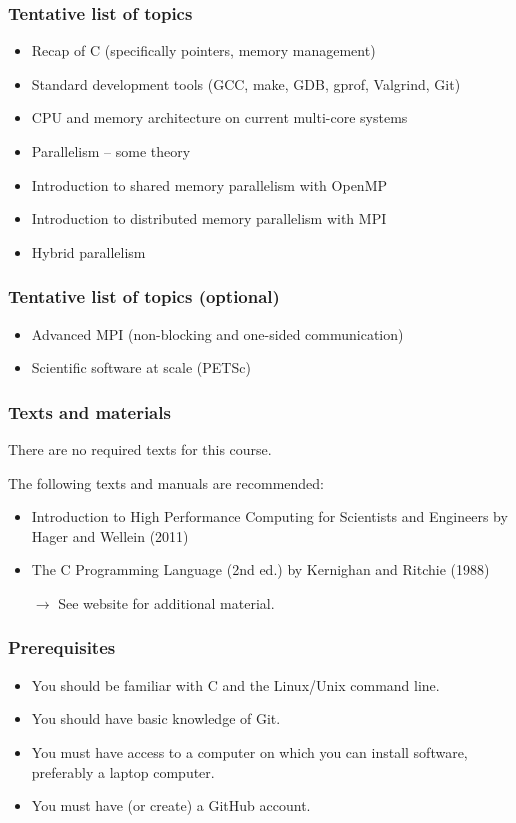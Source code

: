 \documentclass[12pt,t]{beamer}
\begin{document}
  \begin{frame}
    \frametitle{Tentative list of topics}

    \begin{itemize}
      \item Recap of C (specifically pointers, memory management)
      \item Standard development tools (GCC, make, GDB, gprof, Valgrind, Git)
      \item CPU and memory architecture on current multi-core systems
      \item Parallelism -- some theory
      \item Introduction to shared memory parallelism with OpenMP
      \item Introduction to distributed memory parallelism with MPI
      \item Hybrid parallelism
    \end{itemize}
  \end{frame}

  \begin{frame}
    \frametitle{Tentative list of topics (optional)}

    \begin{itemize}
      \item Advanced MPI (non-blocking and one-sided communication)
      \item Scientific software at scale (PETSc)
    \end{itemize}
  \end{frame}

  \begin{frame}
    \frametitle{Texts and materials}

    There are no required texts for this course.

    The following texts and manuals are recommended:
    \begin{itemize}
      \item Introduction to High Performance Computing for Scientists and Engineers by Hager and Wellein (2011)
      \item The C Programming Language (2nd ed.) by Kernighan and Ritchie (1988)
    \end{itemize}
    \begin{itemize}
      \item[$\rightarrow$] See website for additional material.
    \end{itemize}
  \end{frame}

  \begin{frame}
    \frametitle{Prerequisites}

    \begin{itemize}
      \item You should be familiar with C and the Linux/Unix command line.
      \item You should have basic knowledge of Git.
      \item You must have access to a computer on which you can install software, preferably a laptop computer.
      \item You must have (or create) a GitHub account.
    \end{itemize}
  \end{frame}
\end{document}
